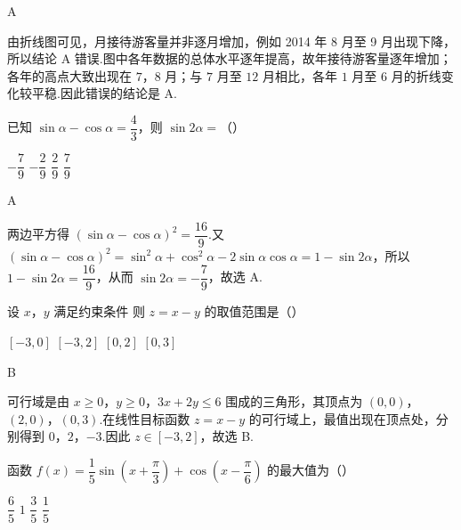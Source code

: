 \begin{answer}
A
\end{answer}

\begin{solution}
由折线图可见，月接待游客量并非逐月增加，例如 2014 年 8 月至 9 月出现下降，所以结论 A 错误.图中各年数据的总体水平逐年提高，故年接待游客量逐年增加；各年的高点大致出现在 \(7\)，\(8\) 月；与 \(7\) 月至 \(12\) 月相比，各年 \(1\) 月至 \(6\) 月的折线变化较平稳.因此错误的结论是 A.
\end{solution}

\begin{problem}
已知 \(\sin\alpha-\cos\alpha=\dfrac{4}{3}\)，则 \(\sin2\alpha=\)（\quad）

\choices
    {\(-\dfrac{7}{9}\)}
    {\(-\dfrac{2}{9}\)}
    {\(\dfrac{2}{9}\)}
    {\(\dfrac{7}{9}\)}
\end{problem}

\begin{answer}
A
\end{answer}

\begin{solution}
两边平方得 \((\sin\alpha-\cos\alpha)^2=\dfrac{16}{9}\).又 \((\sin\alpha-\cos\alpha)^2=\sin^2\alpha+\cos^2\alpha-2\sin\alpha\cos\alpha=1-\sin2\alpha\)，所以 \(1-\sin2\alpha=\dfrac{16}{9}\)，从而 \(\sin2\alpha=-\dfrac79\)，故选 A.
\end{solution}

\begin{problem}
设 \(x\)，\(y\) 满足约束条件
则 \(z=x-y\) 的取值范围是（\quad）

\choices
    {\([-3,0]\)}
    {\([-3,2]\)}
    {\([0,2]\)}
    {\([0,3]\)}
\end{problem}

\begin{answer}
B
\end{answer}

\begin{solution}
可行域是由 \(x\geq0\)，\(y\geq0\)，\(3x+2y\leq6\) 围成的三角形，其顶点为 \((0,0)\)，\((2,0)\)，\((0,3)\).在线性目标函数 \(z=x-y\) 的可行域上，最值出现在顶点处，分别得到 \(0\)，\(2\)，\(-3\).因此 \(z\in[-3,2]\)，故选 B.
\end{solution}

\begin{problem}
函数 \(f(x)=\dfrac15\sin\left(x+\dfrac{\pi}{3}\right)+\cos\left(x-\dfrac{\pi}{6}\right)\) 的最大值为（\quad）

\choices
    {\(\dfrac65\)}
    {\(1\)}
    {\(\dfrac35\)}
    {\(\dfrac15\)}
\end{problem}

